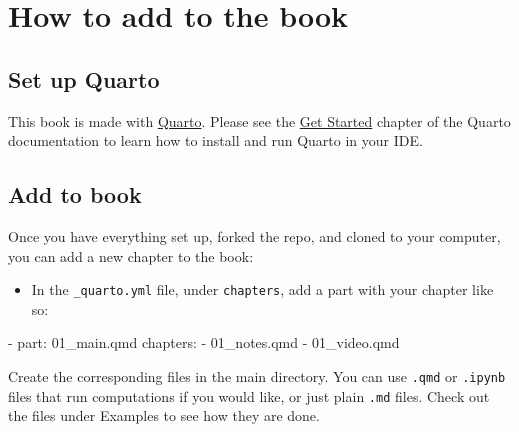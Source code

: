 \documentclass[
  letterpaper,
  DIV=11,
  numbers=noendperiod]{scrreprt}
\newenvironment{Shaded}{\begin{snugshade}}{\end{snugshade}}
\newcommand{\AttributeTok}[1]{\textcolor[rgb]{0.00,0.48,0.65}{#1}}
\newcommand{\FunctionTok}[1]{\textcolor[rgb]{0.28,0.35,0.67}{#1}}
\newcommand{\KeywordTok}[1]{\textcolor[rgb]{0.00,0.48,0.65}{#1}}
\providecommand{\tightlist}{%
  \setlength{\itemsep}{0pt}\setlength{\parskip}{0pt}}
\begin{document}
\appendix
{}

\hypertarget{how-to-add-to-the-book}{%
\chapter*{How to add to the book}\label{how-to-add-to-the-book}}

\hypertarget{set-up-quarto}{%
\section*{Set up Quarto}\label{set-up-quarto}}

This book is made with \href{https://quarto.org/}{Quarto}. Please see
the \href{https://quarto.org/docs/get-started/}{Get Started} chapter of
the Quarto documentation to learn how to install and run Quarto in your
IDE.

\hypertarget{add-to-book}{%
\section*{Add to book}\label{add-to-book}}

Once you have everything set up, forked the repo, and cloned to your
computer, you can add a new chapter to the book:

\begin{itemize}
\tightlist
\item
  In the \texttt{\_quarto.yml} file, under \texttt{chapters}, add a part
  with your chapter like so:
\end{itemize}

\begin{Shaded}
\begin{Highlighting}[]
\AttributeTok{  }\KeywordTok{{-}}\AttributeTok{ }\FunctionTok{part}\KeywordTok{:}\AttributeTok{ 01\_main.qmd}
\AttributeTok{      }\FunctionTok{chapters}\KeywordTok{:}\AttributeTok{ }
\AttributeTok{      }\KeywordTok{{-}}\AttributeTok{ 01\_notes.qmd}
\AttributeTok{      }\KeywordTok{{-}}\AttributeTok{ 01\_video.qmd}
\end{Highlighting}
\end{Shaded}

Create the corresponding files in the main directory. You can use
\texttt{.qmd} or \texttt{.ipynb} files that run computations if you
would like, or just plain \texttt{.md} files. Check out the files under
Examples to see how they are done.
\end{document}
